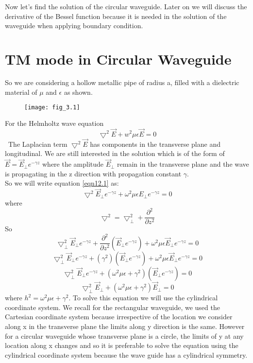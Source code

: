 	 Now let's find the solution of the circular waveguide. Later on we will discuss the derivative of the Bessel function because it is needed in the solution of the waveguide when applying boundary condition.
	 
	 \section{TM mode in Circular Waveguide}
	 So we are considering a hollow metallic pipe of radius a, filled with a dielectric material of $\mu$ and $\epsilon$ as shown.
	 
	\begin{figure}[H]
		\centering
		\texttt{[image: fig\_3.1]}
		\caption{}
		\label{fig:fig3}
	\end{figure}
	 
	 For the Helmholtz wave equation 
	 \begin{equation}
	 	\bigtriangledown^2\vec{E} + w^2\mu\epsilon\vec{E}=0
	 	\label{eqn12.1}
	 \end{equation}\
	 The Laplacian term $\bigtriangledown^2\vec{E}$ has components in the transverse plane and longitudinal. We are still interested in the solution which is of the form of $\vec{E}=\vec{E}_{\bot}e^{-\gamma z}$ where the amplitude $\vec{E}_\bot$ remain in the transverse plane and the wave is propagating in the z direction with propagation constant $\gamma$. \\
	 So we will write equation \ref{eqn12.1} as:
	 \[\bigtriangledown^2\vec{E}_\perp e^{-\gamma z} + \omega^2 \mu\epsilon E_\perp e^{-\gamma z} = 0\]
	 where \[\bigtriangledown^2 = \bigtriangledown^2_\perp + \frac{\partial^2}{\partial z^2}\]
	 So 
	 \[\bigtriangledown^2_\perp\vec{E}_\perp e^{-\gamma z} + \frac{\partial^2}{\partial z^2}\left(\vec{E}_\perp e^{-\gamma z}\right) + \omega^2\mu\epsilon\vec{E}_\perp e^{-\gamma z} = 0\]
	 \[\bigtriangledown^2_\perp\vec{E}_\perp e^{-\gamma z} + (\gamma^2)\left(\vec{E}_\perp e^{-\gamma z}\right) + \omega^2\mu\epsilon\vec{E}_\perp e^{-\gamma z} = 0\]
	 \[\bigtriangledown^2_\perp\vec{E}_\perp e^{-\gamma z} + (\omega^2\mu\epsilon + \gamma^2)\left(\vec{E}_\perp e^{-\gamma z}\right) = 0\]
	 \begin{equation}
	 	\bigtriangledown^2_\perp\vec{E}_\perp + (\omega^2\mu\epsilon + \gamma^2)\vec{E}_\perp = 0
	 	\label{eqn12.2}
	 \end{equation}
	 where $h^2 = \omega^2\mu\epsilon + \gamma^2$. To solve this equation we will use the cylindrical coordinate system. We recall for the rectangular waveguide, we used the Cartesian coordinate system because irrespective of the location we consider along x in the transverse plane the limits along y direction is the same. However for a circular waveguide whose transverse plane is a circle, the limits of y at any location along x changes and so it is preferable to solve the equation using the cylindrical coordinate system because the wave guide has a cylindrical symmetry.\\
	 
